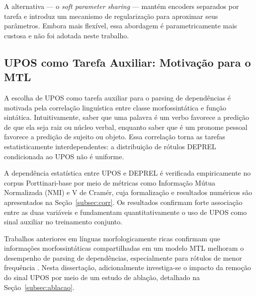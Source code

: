 A alternativa — o \textit{soft parameter sharing} — mantém encoders separados por tarefa e
introduz um mecanismo de regularização para aproximar seus parâmetros. Embora mais flexível,
essa abordagem é parametricamente mais custosa e não foi adotada neste trabalho.

\subsection{UPOS como Tarefa Auxiliar: Motivação para o MTL}
\label{subsec:mtl-upos}

A escolha de UPOS como tarefa auxiliar para o parsing de dependências é motivada pela
correlação linguística entre classe morfossintática e função sintática. Intuitivamente,
saber que uma palavra é um verbo favorece a predição de que ela seja raiz ou núcleo verbal,
enquanto saber que é um pronome pessoal favorece a predição de sujeito ou objeto. Essa
correlação torna as tarefas estatisticamente interdependentes: a distribuição de rótulos
DEPREL condicionada ao UPOS não é uniforme.

A dependência estatística entre UPOS e DEPREL é verificada empiricamente no corpus
Porttinari-base por meio de métricas como Informação Mútua Normalizada (NMI) e V de Cramér,
cuja formalização e resultados numéricos são apresentados na Seção~\ref{subsec:corr}. Os
resultados confirmam forte associação entre as duas variáveis e fundamentam quantitativamente
o uso de UPOS como sinal auxiliar no treinamento conjunto.

Trabalhos anteriores em línguas morfologicamente ricas confirmam que informações
morfossintáticas compartilhadas em um modelo MTL melhoram o desempenho de parsing de
dependências, especialmente para rótulos de menor frequência
\cite{kondratyuk201975}. Nesta dissertação, adicionalmente investiga-se o impacto da
remoção do sinal UPOS por meio de um estudo de ablação, detalhado na
Seção~\ref{subsec:ablacao}.

